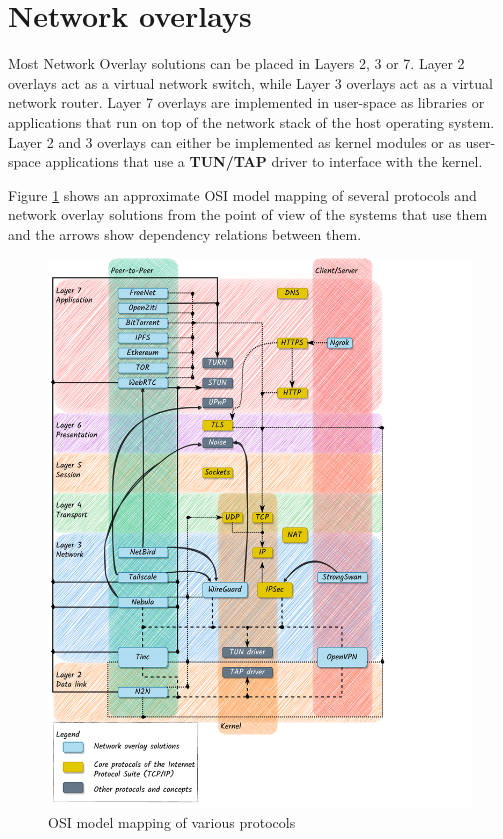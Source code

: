 \hypertarget{thesis__020-related-work.md__network-overlays}{%
\section{Network
overlays}\label{thesis__020-related-work.md__network-overlays}}

Most Network Overlay solutions can be placed in Layers 2, 3 or 7. Layer
2 overlays act as a virtual network switch, while Layer 3 overlays act
as a virtual network router. Layer 7 overlays are implemented in
user-space as libraries or applications that run on top of the network
stack of the host operating system. Layer 2 and 3 overlays can either be
implemented as kernel modules or as user-space applications that use a
\textbf{TUN/TAP} driver to interface with the kernel.

Figure \ref{osi-map-overlays} shows an approximate OSI model mapping of
several protocols and network overlay solutions from the point of view
of the systems that use them and the arrows show dependency relations
between them.

\begin{figure}
\centering
\includegraphics[width=\textwidth,height=0.9\textheight]{thesis/../figures/osi-map-overlays.drawio.pdf}
\caption{OSI model mapping of various protocols
\label{osi-map-overlays}}
\end{figure}

